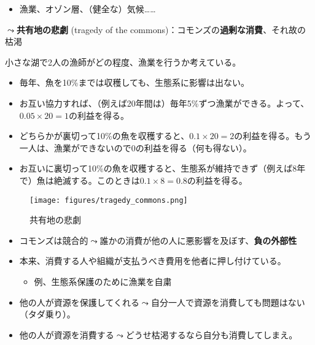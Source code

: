 \documentclass[
  xelatex,
  ja=standard]{bxjsarticle}
\providecommand{\tightlist}{%
  \setlength{\itemsep}{0pt}\setlength{\parskip}{0pt}}\usepackage{longtable,booktabs,array}
\begin{document}
\begin{itemize}
\tightlist
\item
  漁業、オゾン層、（健全な）気候\ldots\ldots{}
\end{itemize}

\(\leadsto\)\textbf{共有地の悲劇} (tragedy of the
commons)\citep{hardin1968}：コモンズの\textbf{過剰な消費}、それ故の枯渇

\begin{tcolorbox}[enhanced jigsaw, title=\textcolor{quarto-callout-tip-color}{\faLightbulb}\hspace{0.5em}{共有地の悲劇}, bottomtitle=1mm, rightrule=.15mm, breakable, arc=.35mm, leftrule=.75mm, opacityback=0, colbacktitle=quarto-callout-tip-color!10!white, left=2mm, coltitle=black, toptitle=1mm, titlerule=0mm, colback=white, bottomrule=.15mm, toprule=.15mm, colframe=quarto-callout-tip-color-frame, opacitybacktitle=0.6]

小さな湖で2人の漁師がどの程度、漁業を行うか考えている。

\begin{itemize}
\tightlist
\item
  毎年、魚を10\%までは収穫しても、生態系に影響は出ない。
\item
  お互い協力すれば、（例えば20年間は）毎年5\%ずつ漁業ができる。よって、\(0.05 \times 20 = 1\)の利益を得る。
\item
  どちらかが裏切って10\%の魚を収穫すると、\(0.1 \times 20 = 2\)の利益を得る。もう一人は、漁業ができないので\(0\)の利益を得る（何も得ない）。
\item
  お互いに裏切って10\%の魚を収穫すると、生態系が維持できず（例えば8年で）魚は絶滅する。このときは\(0.1 \times 8 = 0.8\)の利益を得る。
\end{itemize}

\end{tcolorbox}

\begin{figure}[htpb]

{\centering \texttt{[image: figures/tragedy\_commons.png]}

}

\caption{共有地の悲劇}

\end{figure}

\begin{itemize}
\tightlist
\item
  コモンズは競合的\(\leadsto\)誰かの消費が他の人に悪影響を及ぼす、\textbf{負の外部性}
\item
  本来、消費する人や組織が支払うべき費用を他者に押し付けている。

  \begin{itemize}
  \tightlist
  \item
    例、生態系保護のために漁業を自粛
  \end{itemize}
\item
  他の人が資源を保護してくれる\(\leadsto\)自分一人で資源を消費しても問題はない（タダ乗り）。
\item
  他の人が資源を消費する\(\leadsto\)どうせ枯渇するなら自分も消費してしまえ。
\end{itemize}
\end{document}
